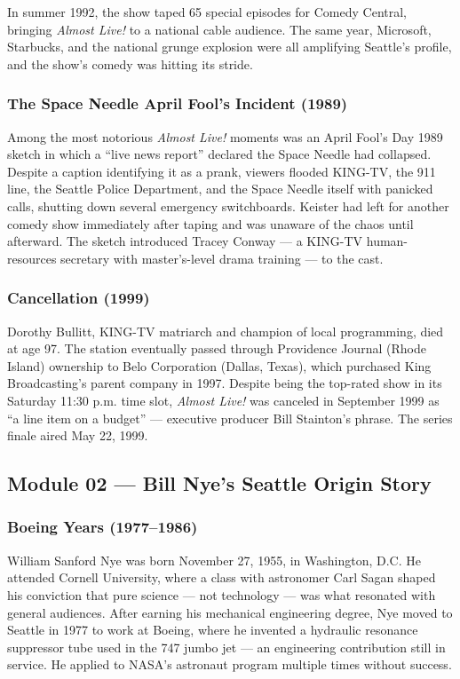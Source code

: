 \documentclass[11pt,letterpaper]{article}
\begin{document}
In summer 1992, the show taped 65 special episodes for Comedy Central, bringing \textit{Almost Live!} to a national cable audience. The same year, Microsoft, Starbucks, and the national grunge explosion were all amplifying Seattle's profile, and the show's comedy was hitting its stride.

\subsubsection{The Space Needle April Fool's Incident (1989)}

Among the most notorious \textit{Almost Live!} moments was an April Fool's Day 1989 sketch in which a ``live news report'' declared the Space Needle had collapsed. Despite a caption identifying it as a prank, viewers flooded KING-TV, the 911 line, the Seattle Police Department, and the Space Needle itself with panicked calls, shutting down several emergency switchboards. Keister had left for another comedy show immediately after taping and was unaware of the chaos until afterward. The sketch introduced Tracey Conway --- a KING-TV human-resources secretary with master's-level drama training --- to the cast.

\subsubsection{Cancellation (1999)}

Dorothy Bullitt, KING-TV matriarch and champion of local programming, died at age 97. The station eventually passed through Providence Journal (Rhode Island) ownership to Belo Corporation (Dallas, Texas), which purchased King Broadcasting's parent company in 1997. Despite being the top-rated show in its Saturday 11:30 p.m. time slot, \textit{Almost Live!} was canceled in September 1999 as ``a line item on a budget'' --- executive producer Bill Stainton's phrase. The series finale aired May 22, 1999.

\subsection{Module 02 --- Bill Nye's Seattle Origin Story}

\subsubsection{Boeing Years (1977--1986)}

William Sanford Nye was born November 27, 1955, in Washington, D.C. He attended Cornell University, where a class with astronomer Carl Sagan shaped his conviction that pure science --- not technology --- was what resonated with general audiences. After earning his mechanical engineering degree, Nye moved to Seattle in 1977 to work at Boeing, where he invented a hydraulic resonance suppressor tube used in the 747 jumbo jet --- an engineering contribution still in service. He applied to NASA's astronaut program multiple times without success.
\end{document}
